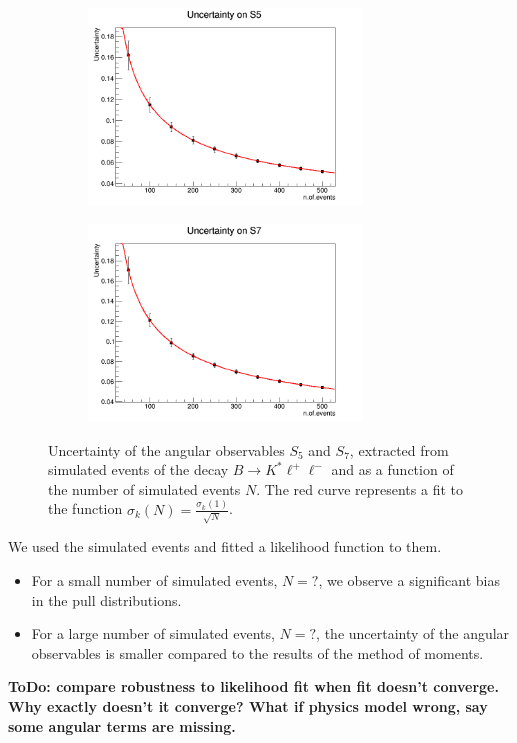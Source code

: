 \documentclass[aps,prd,reprint,nofootinbib,preprintnumbers]{revtex4}
\newcommand{\todo}[1]{{\color{red}\bf ToDo: #1}}
\newcommand{\danny}[1]{{\color{purple}#1}}
\begin{document}
\begin{figure}[t]
        \centering
        \begin{subfigure}[b]{0.45\textwidth}
                \includegraphics[width=0.8\textwidth]{figs/Q2_5_6_S5.png}
        \end{subfigure}
        \begin{subfigure}[b]{0.45\textwidth}
                \includegraphics[width=0.8\textwidth]{figs/Q2_5_6_S7.png}
        \end{subfigure}
        \caption{Uncertainty of the angular observables $S_5$ and $S_7$, extracted from simulated events of the decay $B\to K^*\ell^+\ell^-$
        and as a function of the number of simulated events $N$. The red curve represents a fit to the function $\sigma_k(N) = \frac{\sigma_k(1)}{\sqrt{N}}$.}
        \label{fig:errors}
\end{figure}


We used the simulated events and fitted a likelihood function to them.
\begin{itemize}
    \item For a small number of simulated events, \danny{$N=?$}, we observe a significant bias in the pull distributions.
    \item For a large number of simulated events, \danny{$N=?$}, the uncertainty of the angular observables is
        smaller compared to the results of the method of moments.
\end{itemize}
\todo{compare robustness to likelihood fit when fit doesn't
converge. Why exactly doesn't it converge? What if physics model
wrong, say some angular terms are missing.}
\end{document}
